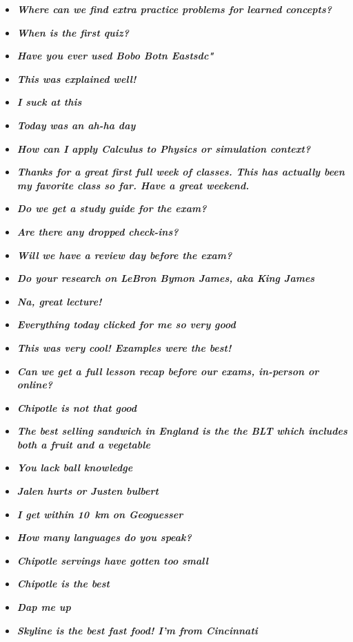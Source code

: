 \documentclass[11pt,letterpaper]{article}
\begin{document}
\begin{itemize}
\item {\bfseries\itshape Where can we find extra practice problems for learned concepts?}
\item {\bfseries\itshape When is the first quiz?}
\item {\bfseries\itshape Have you ever used Bobo Botn Eastsdc"}
\item {\bfseries\itshape This was explained well!}
\item {\bfseries\itshape I suck at this}
\item {\bfseries\itshape Today was an ah-ha day}
\item {\bfseries\itshape How can I apply Calculus to Physics or simulation context?} 
\item {\bfseries\itshape Thanks for a great first full week of classes. This has actually been my favorite class so far. Have a great weekend.} 
\item {\bfseries\itshape Do we get a study guide for the exam?}
\item {\bfseries\itshape Are there any dropped check-ins?}
\item {\bfseries\itshape Will we have a review day before the exam?}
\item {\bfseries\itshape Do your research on LeBron Bymon James, aka King James}
\item {\bfseries\itshape Na, great lecture!}
\item {\bfseries\itshape Everything today clicked for me so very good} 
\item {\bfseries\itshape This was very cool! Examples were the best!}
\item {\bfseries\itshape Can we get a full lesson recap before our exams, in-person or online?}
\item {\bfseries\itshape Chipotle is not that good}
\item {\bfseries\itshape The best selling sandwich in England is the the BLT which includes both a fruit and a vegetable}
\item {\bfseries\itshape You lack ball knowledge}
\item {\bfseries\itshape Jalen hurts or Justen bulbert} 
\item {\bfseries\itshape I get within 10~km on Geoguesser}
\item {\bfseries\itshape How many languages do you speak?}
\item {\bfseries\itshape Chipotle servings have gotten too small}
\item {\bfseries\itshape Chipotle is the best}
\item {\bfseries\itshape Dap me up} %
\item {\bfseries\itshape Skyline is the best fast food! I'm from Cincinnati} 

\end{itemize}
\end{document}
